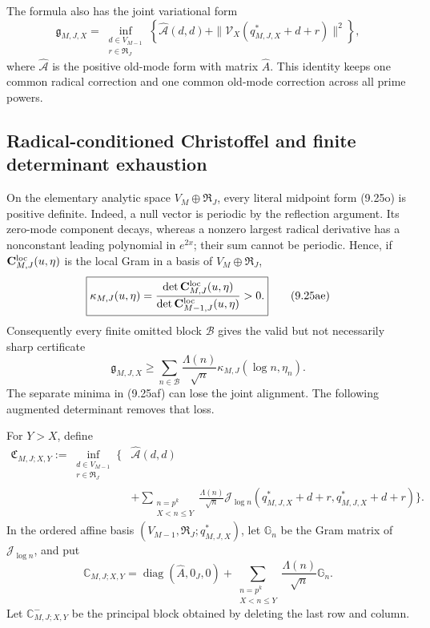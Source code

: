 \documentclass[11pt]{amsart}
\theoremstyle{definition}
\theoremstyle{remark}
\begin{document}
The formula also has the joint variational form
\[
 \boxed{
 \mathfrak g_{M,J,X}
 =\inf_{\substack{d\in V_{M-1}\\r\in\mathfrak R_J}}
 \left\{\widehat{\mathcal A}(d,d)
 +\|\mathcal V_X(q_{M,J,X}^*+d+r)\|^2\right\},}
\tag{9.25ad}
\]
where \(\widehat{\mathcal A}\) is the positive old-mode form with matrix
\(\widehat A\).  This identity keeps one common radical correction and
one common old-mode correction across all prime powers.

\subsection{Radical-conditioned Christoffel and finite determinant
exhaustion}

On the elementary analytic space \(V_M\oplus\mathfrak R_J\), every
literal midpoint form (9.25o) is positive definite.  Indeed, a null
vector is periodic by the reflection argument.  Its zero-mode component
decays, whereas a nonzero largest radical derivative has a nonconstant
leading polynomial in \(e^{2x}\); their sum cannot be periodic.  Hence,
if \(\mathbf C_{M,J}^{\rm loc}(u,\eta)\) is the local Gram in a basis of
\(V_M\oplus\mathfrak R_J\),
\[
 \boxed{
 \kappa_{M,J}(u,\eta)
 =\frac{\det\mathbf C_{M,J}^{\rm loc}(u,\eta)}
        {\det\mathbf C_{M-1,J}^{\rm loc}(u,\eta)}>0.}
\tag{9.25ae}
\]
Consequently every finite omitted block \(\mathcal B\) gives the valid
but not necessarily sharp certificate
\[
 \mathfrak g_{M,J,X}\ge
 \sum_{n\in\mathcal B}\frac{\Lambda(n)}{\sqrt n}
 \kappa_{M,J}(\log n,\eta_n).
\tag{9.25af}
\]
The separate minima in (9.25af) can lose the joint alignment.  The
following augmented determinant removes that loss.

For \(Y>X\), define
\[
\begin{aligned}
 \mathfrak C_{M,J;X,Y}:=
 \inf_{\substack{d\in V_{M-1}\\r\in\mathfrak R_J}}
 \bigg\{&\widehat{\mathcal A}(d,d)\\
 &+\sum_{\substack{n=p^k\\X<n\le Y}}
 \frac{\Lambda(n)}{\sqrt n}
 \mathcal J_{\log n}(q_{M,J,X}^*+d+r,q_{M,J,X}^*+d+r)
 \bigg\}.
\end{aligned}
\tag{9.25ag}
\]
In the ordered affine basis
\((V_{M-1},\mathfrak R_J;q_{M,J,X}^*)\), let
\(\mathbb G_n\) be the Gram matrix of \(\mathcal J_{\log n}\), and put
\[
 \mathbb C_{M,J;X,Y}
 =\operatorname{diag}(\widehat A,0_J,0)
 +\sum_{\substack{n=p^k\\X<n\le Y}}
 \frac{\Lambda(n)}{\sqrt n}\mathbb G_n.
\tag{9.25ah}
\]
Let \(\mathbb C_{M,J;X,Y}^{-}\) be the principal block obtained by
deleting the last row and column.
\end{document}
